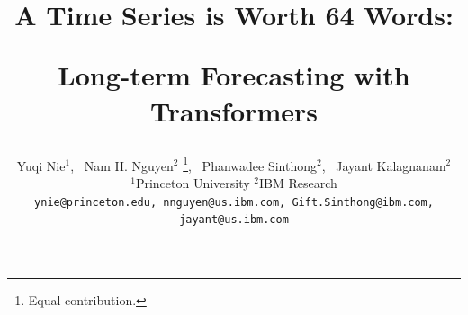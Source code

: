 \documentclass{article} %
\title{
A Time Series is Worth 64 Words:

Long-term Forecasting with Transformers





}
\author{Yuqi Nie$^{1}$\footnotemark[1], \ Nam H. Nguyen$^{2}$ \thanks{Equal contribution.}, \ Phanwadee Sinthong$^{2}$, \ Jayant Kalagnanam$^{2}$ \\
$^{1}$Princeton University $^{2}$IBM Research\\
\texttt{ynie@princeton.edu, nnguyen@us.ibm.com, Gift.Sinthong@ibm.com,} \\
\texttt{jayant@us.ibm.com} \\
}
\newcommand{\gift}[1]{\textcolor{red}{Gift: #1}}
\begin{document}
\maketitle

\begin{abstract}




\end{abstract}
\end{document}
